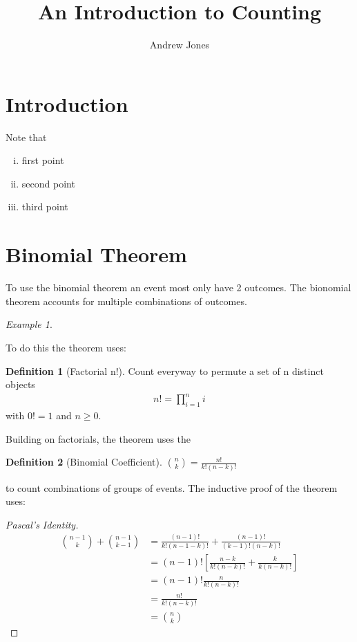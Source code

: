 \documentclass{article}
\title{An Introduction to Counting}
\author{Andrew Jones}\date{}
\theoremstyle{plain}
\theoremstyle{definition}
\newtheorem{definition}{Definition}
\theoremstyle{remark}
\newtheorem{example}{Example}
\begin{document}
\maketitle



\section*{Introduction}

Note that
\begin{enumerate}[i.,noitemsep]
	\item first point
	\item second point
	\item third point
\end{enumerate}




\section{Binomial Theorem}
To use the binomial theorem an event most only have 2 outcomes.
The bionomial theorem accounts for multiple combinations of
outcomes.
\begin{example}

\end{example}

To do this the theorem uses:
\begin{definition}[Factorial n!]
  Count everyway to permute a set of n distinct objects
  \begin{align*}
    n! = {\displaystyle\prod_{i=1}^{n}i}
  \end{align*}
  with $0! = 1$ and $n \geq 0$.
\end{definition}
Building on factorials, the theorem uses the
\begin{definition}[Binomial Coefficient]
	$\binom{n}{k} = \frac{n!}{k!(n-k)!}$
\end{definition}
to count combinations of groups of events.
The inductive proof of the theorem uses:
\begin{proof}[Pascal's Identity]
  \begin{align*}
    \binom{n - 1}{k} + \binom{n - 1}{k - 1} &= \frac{(n-1)!}{k!(n - 1 - k)!} + \frac{(n - 1)!}{(k-1)!(n-k)!} \\
    &= (n - 1)![\frac{n-k}{k!(n-k)!} + \frac{k}{k(n-k)!}] \\
    &= (n - 1)!\frac{n}{k!(n-k)!} \\
    &= \frac{n!}{k!(n - k)!} \\
    &= \binom{n}{k}
  \end{align*}
\end{proof}
\end{document}
